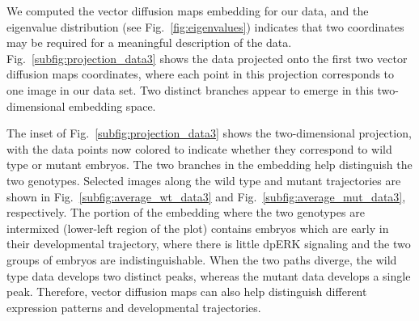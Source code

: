 \documentclass{pnastwo}
\newcommand{\fig}[0]{Fig.}
\begin{document}
\begin{article}
We computed the vector diffusion maps embedding for our data, and the eigenvalue distribution (see \fig~\ref{fig:eigenvalues}) indicates that two coordinates may be required for a meaningful description of the data. 
%
\fig~\ref{subfig:projection_data3} shows the data projected onto the first two vector diffusion maps coordinates, where each point in this projection corresponds to one image in our data set.
%
Two distinct branches appear to emerge in this two-dimensional embedding space.


The inset of \fig~\ref{subfig:projection_data3} shows the two-dimensional projection, with the data points now colored to indicate whether they correspond to wild type or mutant embryos.
%
The two branches in the embedding help distinguish the two genotypes.
%
Selected images along the wild type and mutant trajectories are shown in \fig~\ref{subfig:average_wt_data3} and \fig~\ref{subfig:average_mut_data3}, respectively.
%
The portion of the embedding where the two genotypes are intermixed (lower-left region of the plot) contains embryos which are early in their developmental trajectory, where there is little dpERK signaling and the two groups of embryos are indistinguishable. 
%
When the two paths diverge, the wild type data develops two distinct peaks, whereas the mutant data develops a single peak.
%
Therefore, vector diffusion maps can also help distinguish different expression patterns and developmental trajectories.


\end{article}
\end{document}
